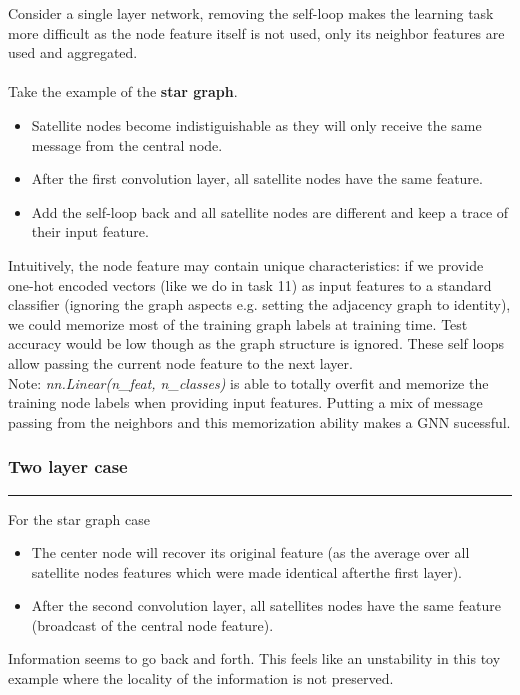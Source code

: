 \documentclass[a4paper]{article}
\begin{document}
Consider a single layer network, removing the self-loop makes the learning task more difficult as the node feature itself is not used, only its neighbor features are used and aggregated.
\\
\\
Take the example of the \textbf{star graph}. 
\begin{itemize}
    \item Satellite nodes become indistiguishable as they will only receive the same message from the central node. 
    \item After the first convolution layer, all satellite nodes have the same feature.
    \item Add the self-loop back and all satellite nodes are different and keep a trace of their input feature.
\end{itemize}

Intuitively, the node feature may contain unique characteristics: 
if we provide one-hot encoded vectors (like we do in task 11) as input features to a standard classifier (ignoring the graph aspects e.g. setting the adjacency graph to identity),
we could memorize most of the training graph labels at training time. Test accuracy would be low though as the graph structure is ignored.
These self loops allow passing the current node feature to the next layer.\\
Note: \textit{nn.Linear(n\_feat, n\_classes)} is able to totally overfit and memorize the training node labels when providing input features.
Putting a mix of message passing from the neighbors and this memorization ability makes a GNN sucessful.



\subsubsection*{Two layer case}
\hrule

For the star graph case
\begin{itemize}
    \item The center node will recover its original feature (as the average over all satellite nodes features which were made identical afterthe first layer).
    \item After the second convolution layer, all satellites nodes have the same feature (broadcast of the central node feature).
\end{itemize}
Information seems to go back and forth. This feels like an unstability in this toy example where the locality of the information is not preserved.
\end{document}
